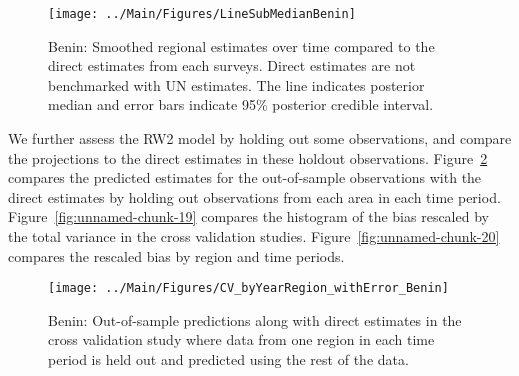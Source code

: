 \documentclass[12pt]{article}\usepackage[]{graphicx}\usepackage[]{color}
\newenvironment{knitrout}{}{} %
\begin{document}
\begin{knitrout}
\color{fgcolor}\begin{figure}[bht]

{\centering \texttt{[image: ../Main/Figures/LineSubMedianBenin]} 

}

\caption[Benin]{Benin: Smoothed regional estimates over time compared to the direct estimates from each surveys. Direct estimates are not benchmarked with UN estimates. The line indicates posterior median and error bars indicate 95\% posterior credible interval.}\label{fig:unnamed-chunk-17}
\end{figure}


\end{knitrout}
We further assess the RW2 model by holding out some observations, and compare the projections to the direct estimates in these holdout observations. Figure~\ref{fig:unnamed-chunk-18} compares the predicted estimates for the out-of-sample observations  with the direct estimates by holding out observations from each area in each time period.  Figure~\ref{fig:unnamed-chunk-19} compares the histogram of the bias rescaled by the total variance in the cross validation studies. Figure~\ref{fig:unnamed-chunk-20} compares the rescaled bias by region and time periods.



 
\begin{knitrout}
\color{fgcolor}\begin{figure}[bht]

{\centering \texttt{[image: ../Main/Figures/CV\_byYearRegion\_withError\_Benin]} 

}

\caption[Benin]{Benin: Out-of-sample predictions along with direct estimates in the cross validation study where data from one region in each time period is held out and predicted using the rest of the data.}\label{fig:unnamed-chunk-18}
\end{figure}


\end{knitrout}
\end{document}
